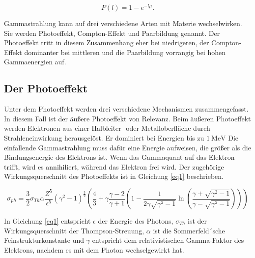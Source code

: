 \begin{equation}
    P(l) = 1 - e^{-l\mu}.
    \label{2.2}
\end{equation}

Gammastrahlung kann auf drei verschiedene Arten mit Materie wechselwirken.
Sie werden Photoeffekt, Compton-Effekt und Paarbildung genannt.
Der Photoeffekt tritt in diesem Zusammenhang eher bei niedrigeren, der 
Compton-Effekt dominanter bei mittleren und die Paarbildung vorrangig
bei hohen Gammaenergien auf.

\subsection{Der Photoeffekt}
Unter dem Photoeffekt werden drei verschiedene Mechanismen zusammengefasst.
In diesem Fall ist der äußere Photoeffekt von Relevanz.
Beim äußeren Photoeffekt werden Elektronen aus einer Halbleiter- oder Metalloberfläche 
durch Strahleneinwirkung herausgelöst. 
Er dominiert bei Energien bis zu $\SI{1}{\mega\eV}$
Die einfallende Gammastrahlung muss dafür eine Energie aufweisen, die größer als die 
Bindungsenergie des Elektrons ist. Wenn das Gammaquant auf das Elektron trifft, wird es 
annihiliert, während das Elektron frei wird. Der zugehörige 
Wirkungsquerschnitt des Photoeffekts ist in Gleichung \ref{eq1} beschrieben.

\begin{equation}
    \sigma_{ph} = \frac{3}{2} \sigma_{Th} \alpha \frac{Z^5}{\epsilon^5} (\gamma^2 -1)^{\frac{3}{2}} \left(\frac{4}{3} + \gamma\frac{\gamma -2}{\gamma+1} \left(1 - \frac{1}{2 \gamma \sqrt{\gamma^2 -1}} \ln\left(\frac{\gamma + \sqrt{\gamma^2 - 1}}{\gamma - \sqrt{\gamma^2 -1}} \right) \right) \right)
    \label{eq1}
\end{equation}

In Gleichung \ref{eq1} entspricht $\epsilon$ der Energie des Photons, $\sigma_{Th}$
ist der Wirkungsquerschnitt der Thompson-Streuung, $\alpha$ ist die 
Sommerfeld´sche Feinstrukturkonstante und $\gamma$ entspricht dem relativistischen 
Gamma-Faktor des Elektrons, nachdem es mit dem Photon wechselgewirkt hat.

